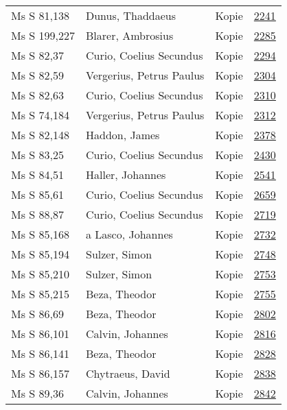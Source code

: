\documentclass[10pt,a4paper,landscape]{report}
\begin{document}
\begin{longtable}{p{16cm}p{4cm}lr}
Ms S 81,138	&	Dunus, Thaddaeus	&	Kopie	&	\href{http://130.60.24.72/assignment/2241}{2241}\\
Ms S 199,227	&	Blarer, Ambrosius	&	Kopie	&	\href{http://130.60.24.72/assignment/2285}{2285}\\
Ms S 82,37	&	Curio, Coelius Secundus	&	Kopie	&	\href{http://130.60.24.72/assignment/2294}{2294}\\
Ms S 82,59	&	Vergerius, Petrus Paulus	&	Kopie	&	\href{http://130.60.24.72/assignment/2304}{2304}\\
Ms S 82,63	&	Curio, Coelius Secundus	&	Kopie	&	\href{http://130.60.24.72/assignment/2310}{2310}\\
Ms S 74,184	&	Vergerius, Petrus Paulus	&	Kopie	&	\href{http://130.60.24.72/assignment/2312}{2312}\\
Ms S 82,148	&	Haddon, James	&	Kopie	&	\href{http://130.60.24.72/assignment/2378}{2378}\\
Ms S 83,25	&	Curio, Coelius Secundus	&	Kopie	&	\href{http://130.60.24.72/assignment/2430}{2430}\\
Ms S 84,51	&	Haller, Johannes	&	Kopie	&	\href{http://130.60.24.72/assignment/2541}{2541}\\
Ms S 85,61	&	Curio, Coelius Secundus	&	Kopie	&	\href{http://130.60.24.72/assignment/2659}{2659}\\
Ms S 88,87	&	Curio, Coelius Secundus	&	Kopie	&	\href{http://130.60.24.72/assignment/2719}{2719}\\
Ms S 85,168	&	a Lasco, Johannes	&	Kopie	&	\href{http://130.60.24.72/assignment/2732}{2732}\\
Ms S 85,194	&	Sulzer, Simon	&	Kopie	&	\href{http://130.60.24.72/assignment/2748}{2748}\\
Ms S 85,210	&	Sulzer, Simon	&	Kopie	&	\href{http://130.60.24.72/assignment/2753}{2753}\\
Ms S 85,215	&	Beza, Theodor	&	Kopie	&	\href{http://130.60.24.72/assignment/2755}{2755}\\
Ms S 86,69	&	Beza, Theodor	&	Kopie	&	\href{http://130.60.24.72/assignment/2802}{2802}\\
Ms S 86,101	&	Calvin, Johannes	&	Kopie	&	\href{http://130.60.24.72/assignment/2816}{2816}\\
Ms S 86,141	&	Beza, Theodor	&	Kopie	&	\href{http://130.60.24.72/assignment/2828}{2828}\\
Ms S 86,157	&	Chytraeus, David	&	Kopie	&	\href{http://130.60.24.72/assignment/2838}{2838}\\
Ms S 89,36	&	Calvin, Johannes	&	Kopie	&	\href{http://130.60.24.72/assignment/2842}{2842}\\

\end{longtable}
\end{document}
